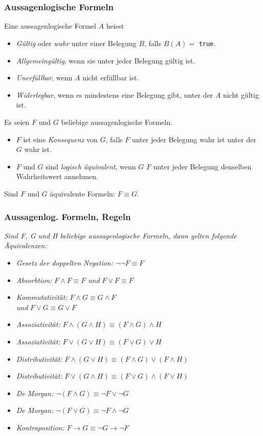 \subsubsection{Aussagenlogische Formeln}%
\label{ssub:aussagenlogische_formeln}
\begin{minipage}{0.9\linewidth}
Eine aussagenlogische Formel $A$ heisst
\begin{itemize}
 \item \textit{Gültig} oder \textit{wahr} unter einer Belegung $B$, falls $\hat{B}(A)=$ \texttt{true}.
 \item \textit{Allgemeingültig}, wenn sie unter jeder Belegung gültig ist.
 \item \textit{Unerfüllbar}, wenn $A$ nicht erfüllbar ist.
 \item \textit{Widerlegbar}, wenn es mindestens eine Belegung gibt, unter der $A$ nicht gültig ist.
\end{itemize}
Es seien $F$ und $G$ beliebige aussagenlogische Formeln.
\begin{itemize}
 \item $F$ ist eine \textit{Konsequenz} von $G$, falls $F$ unter jeder Belegung wahr ist unter der $G$ wahr ist.
 \item $F$ und $G$ sind \textit{logisch äquivalent}, wenn $G$ $F$ unter jeder Belegung denselben Wahrheitswert annehmen.
\end{itemize}
Sind $F$ und $G$ äquivalente Formeln: $F\equiv G$.
\end{minipage}

\subsubsection{Aussagenlog. Formeln, Regeln}%
\label{ssub:aussagenlog_formeln_regeln}
\textit{Sind F, G und H beliebige aussagenlogische Formeln, dann gelten folgende Äquivalenzen:}
\begin{itemize}
	\item \textit{Gesetz der doppelten Negation: } $\neg\neg F \equiv F$
	\item \textit{Absorbtion: } $F \land F  \equiv F$ \textit{ und } $F \lor  F \equiv F$
	\item \textit{Kommutativität: } $F \land G \equiv G \land F$ \\ \textit{ und } $F \lor G \equiv G \lor F$
	\item \textit{Assoziativität: } $F \land (G \land H) \equiv (F \land G) \land H$
	\item \textit{Assoziativität: } $F \lor (G \lor H) \equiv (F \lor G) \lor H$
	\item \textit{Distributivität: } $F \land (G \lor H) \equiv (F \land G) \lor (F \land H)$
	\item \textit{Distributivität: } $F \lor (G \land H) \equiv (F \lor G) \land (F \lor H)$
	\item \textit{De Morgan: } $\neg(F \land G) \equiv \neg F \lor \neg G$
	\item \textit{De Morgan: } $\neg (F \lor G) \equiv \neg F \land \neg G$
	\item \textit{Kontraposition: } $F \rightarrow G \equiv \neg G \rightarrow \neg F$ 
\end{itemize}

